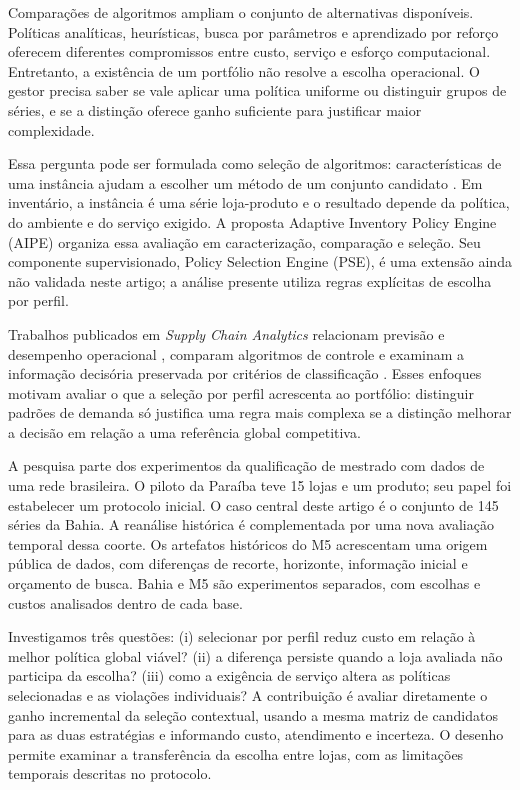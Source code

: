 \documentclass[preprint,12pt]{elsarticle}
\begin{document}
Comparações de algoritmos ampliam o conjunto de alternativas disponíveis. Políticas analíticas, heurísticas, busca por parâmetros e aprendizado por reforço oferecem diferentes compromissos entre custo, serviço e esforço computacional. Entretanto, a existência de um portfólio não resolve a escolha operacional. O gestor precisa saber se vale aplicar uma política uniforme ou distinguir grupos de séries, e se a distinção oferece ganho suficiente para justificar maior complexidade.

Essa pergunta pode ser formulada como seleção de algoritmos: características de uma instância ajudam a escolher um método de um conjunto candidato \cite{rice1976,Kotthoff2014AlgorithmSelection}. Em inventário, a instância é uma série loja-produto e o resultado depende da política, do ambiente e do serviço exigido. A proposta Adaptive Inventory Policy Engine (AIPE) organiza essa avaliação em caracterização, comparação e seleção. Seu componente supervisionado, Policy Selection Engine (PSE), é uma extensão ainda não validada neste artigo; a análise presente utiliza regras explícitas de escolha por perfil.

Trabalhos publicados em \textit{Supply Chain Analytics} relacionam previsão e desempenho operacional \cite{sca_f81ad2b3e023}, comparam algoritmos de controle \cite{sca_27e994c54848} e examinam a informação decisória preservada por critérios de classificação \cite{sca_c5c06dcbc9e5}. Esses enfoques motivam avaliar o que a seleção por perfil acrescenta ao portfólio: distinguir padrões de demanda só justifica uma regra mais complexa se a distinção melhorar a decisão em relação a uma referência global competitiva.

A pesquisa parte dos experimentos da qualificação de mestrado com dados de uma rede brasileira. O piloto da Paraíba teve 15 lojas e um produto; seu papel foi estabelecer um protocolo inicial. O caso central deste artigo é o conjunto de 145 séries da Bahia. A reanálise histórica é complementada por uma nova avaliação temporal dessa coorte. Os artefatos históricos do M5 acrescentam uma origem pública de dados, com diferenças de recorte, horizonte, informação inicial e orçamento de busca. Bahia e M5 são experimentos separados, com escolhas e custos analisados dentro de cada base.

Investigamos três questões: (i) selecionar por perfil reduz custo em relação à melhor política global viável? (ii) a diferença persiste quando a loja avaliada não participa da escolha? (iii) como a exigência de serviço altera as políticas selecionadas e as violações individuais? A contribuição é avaliar diretamente o ganho incremental da seleção contextual, usando a mesma matriz de candidatos para as duas estratégias e informando custo, atendimento e incerteza. O desenho permite examinar a transferência da escolha entre lojas, com as limitações temporais descritas no protocolo.
\end{document}
